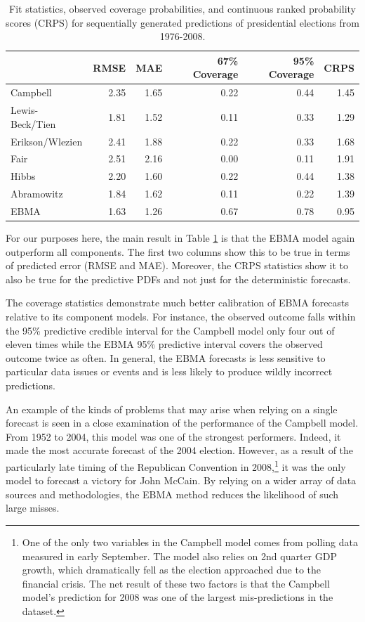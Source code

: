 \documentclass[pdftex,12pt,fullpage,oneside]{amsart}
\begin{document}
\begin{table}[ht!]
  \caption{\footnotesize Fit statistics, observed coverage
    probabilities, and continuous ranked probability scores (CRPS) for
    sequentially generated predictions of presidential elections from 1976-2008.}
\label{Pres-Res} \small
\begin{tabular}{l|rrrrr}
\toprule
	&	RMSE	&	MAE	&	67\% Coverage	&        95\% Coverage	&	CRPS	\\
\midrule
Campbell	&	2.35	&	1.65	&	0.22	&	0.44	&	1.45	\\
Lewis-Beck/Tien	&	1.81	&	1.52	&	0.11	&	0.33	&	1.29	\\
Erikson/Wlezien	&	2.41	&	1.88	&	0.22	&	0.33	&	1.68	\\
Fair	&	2.51	&	2.16	&	0.00	&	0.11	&	1.91	\\
Hibbs	&	2.20	&	1.60	&	0.22	&	0.44	&	1.38	\\
Abramowitz	&	1.84	&	1.62	&	0.11	&	0.22	&	1.39	\\
EBMA	&	1.63	&	1.26	&	0.67	&	0.78
&	0.95	\\
\bottomrule
\end{tabular}
\end{table}

For our purposes here, the main result in Table \ref{Pres-Res} is that
the EBMA model again outperform all components.  The first two columns
show this to be true in terms of predicted error (RMSE and MAE).
Moreover, the CRPS statistics show it to also be true for the
predictive PDFs and not just for the deterministic forecasts.  

The coverage statistics demonstrate much better calibration of EBMA
forecasts relative to its component models.  For instance, the
observed outcome falls within the 95\% predictive credible interval
for the Campbell model only four out of eleven times while the EBMA
95\% predictive interval covers the observed outcome twice as often.
In general, the EBMA forecasts is less sensitive to particular
data issues or events and is less likely to produce wildly incorrect
predictions.  

An example of the kinds of problems that may arise when relying on a
single forecast is seen in a close examination of the performance of the
Campbell model.  From 1952 to 2004, this model was one of the
strongest performers.  Indeed, it made the most accurate forecast of
the 2004 election.  However, as a result of the particularly late
timing of the Republican Convention in 2008,\footnote{One of the only
  two variables in the Campbell model comes from polling data measured
  in early September.  The model also relies on 2nd quarter GDP
  growth, which dramatically fell as the election approached due to
  the financial crisis.  The net result of these two factors is that
  the Campbell model's prediction for 2008 was one of the largest
  mis-predictions in the dataset.} it was the only model to forecast a
victory for John McCain.  By relying on a wider array of data sources
and methodologies, the EBMA method reduces the likelihood of such
large misses.
\end{document}
